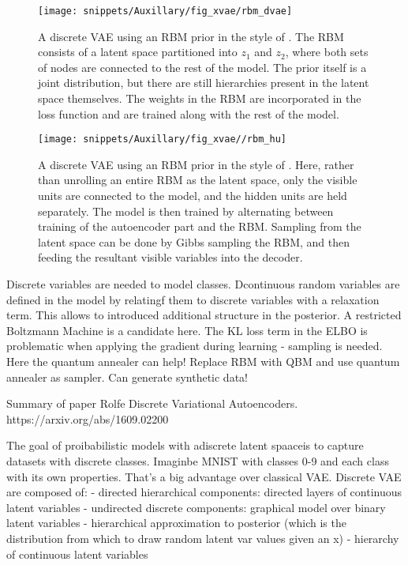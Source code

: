 \begin{figure} \centering
  \texttt{[image: snippets/Auxillary/fig\_xvae/rbm\_dvae]} \caption{A
  discrete VAE using an RBM prior in the style of \cite{Khoshaman2019,Rolfe2016,
  Vahdat2018, Vahdat2018pp}.   The RBM consists of a latent space partitioned
  into $z_1$ and $z_2$, where both sets of nodes are connected to the rest of
  the model. The prior itself is a joint distribution, but there are still
  hierarchies present in the latent space themselves. The weights in the RBM are
  incorporated in the loss function and are trained along with the rest of the
  model.} \label{fig:rbm_vae} \end{figure}
  \begin{figure}[h] \centering
    \texttt{[image: snippets/Auxillary/fig\_xvae//rbm\_hu]} \caption{A
    discrete VAE using an RBM prior in the style of \cite{Hu2018}. Here, rather
    than unrolling an entire RBM as the latent space, only the visible units are
    connected to the model, and the hidden units are held separately. The model
    is then trained by alternating between training of the autoencoder part and
    the RBM. Sampling from the latent space can be done by Gibbs sampling the
    RBM, and then feeding the resultant visible variables into the decoder.}
    \label{fig:rbm_hu} \end{figure}
  

Discrete variables are needed to model classes. Dcontinuous random variables are
defined in the model by relatingf them to discrete variables with a relaxation
term. This allows to introduced additional structure in the posterior. A
restricted Boltzmann Machine is a candidate here. The KL loss term in the ELBO
is problematic when applying the gradient during learning - sampling is needed.
Here the quantum annealer can help! Replace RBM with QBM and use quantum
annealer as sampler. Can generate synthetic data!

Summary of paper Rolfe Discrete Variational Autoencoders.
https://arxiv.org/abs/1609.02200


The goal of proibabilistic models with adiscrete latent spaaceis to capture
datasets with discrete classes. Imaginbe MNIST with classes 0-9 and each class
with its own properties. That's a big advantage over classical VAE. Discrete VAE
are composed of: - directed hierarchical components: directed layers of
continuous latent variables - undirected discrete components: graphical model
over binary latent variables - hierarchical approximation to posterior (which is
the distribution from which to draw random latent var values given an x) -
hierarchy of continuous latent variables

